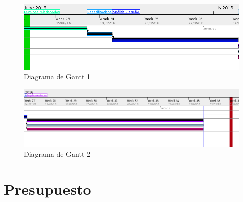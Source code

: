 \begin{figure}[!ht]
  \begin{center}
    \includegraphics[width=1\textwidth]{../images/diag_plan/gantt1.png}
    \caption{Diagrama de Gantt 1}
    \label{fig:diag_gant1}
  \end{center}
\end{figure}

\begin{figure}[!ht]
  \begin{center}
    \includegraphics[width=1\textwidth]{../images/diag_plan/gantt2.png}
    \caption{Diagrama de Gantt 2}
    \label{fig:diag_gant2}
  \end{center}
\end{figure}

\newpage

\section{Presupuesto}

